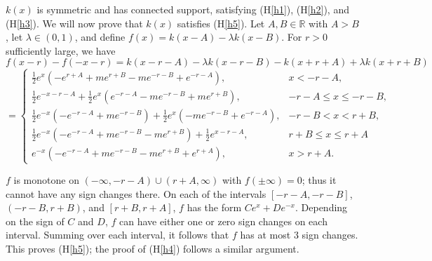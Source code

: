 \documentclass[11pt]{article}
\theoremstyle{definition}
\numberwithin{equation}{section}
\numberwithin{thm}{section}
\newcommand{\hypref}[1]{{(H{\ref{#1}})}}
\begin{document}
$k(x)$ is symmetric and has connected support, satisfying \hypref{h1}, \hypref{h2}, and \hypref{h3}.
We will now prove that $k(x)$ satisfies \hypref{h5}.
Let $A,B\in\mathbb R$ with $A>B$, let $\lambda \in (0,1)$, and define $f(x) = k(x-A) - \lambda k(x-B)$.
For $r>0$ sufficiently large, we have
$$
f(x-r) - f(-x-r) = k(x-r-A) - \lambda k(x-r-B) - k(x+r+A) + \lambda k(x+r+B)
$$
$$
= \begin{cases}
\frac{1}{2} e^{x}\left(-e^{r+A}+me^{r+B}-me^{-r-B}+e^{-r-A}\right) , & x < -r-A, \\
\frac{1}{2}e^{-x-r-A}+\frac{1}{2}e^{x}\left(e^{-r-A}-me^{-r-B}+me^{r+B}\right) , & -r-A \leq x \leq -r-B, \\
\frac{1}{2}e^{-x}\left(-e^{-r-A}+me^{-r-B}\right)+\frac{1}{2}e^{x}\left(-me^{-r-B}+e^{-r-A}\right) , & -r-B < x < r+B, \\
\frac{1}{2}e^{-x}\left(-e^{-r-A}+me^{-r-B}-me^{r+B}\right)+\frac{1}{2}e^{x-r-A}, & r+B \leq x \leq r+A \\
e^{-x}\left(-e^{-r-A}+me^{-r-B}-me^{r+B}+e^{r+A}\right), & x > r+A.
\end{cases}
$$

$f$ is monotone on $(-\infty,-r-A)\cup(r+A,\infty)$ with $f(\pm\infty)=0$; thus it cannot have any sign changes there.
On each of the intervals $[-r-A,-r-B]$, $(-r-B,r+B)$, and $[r+B,r+A]$, $f$ has the form $Ce^x+De^{-x}$.
Depending on the sign of $C$ and $D$, $f$ can have either one or zero sign changes on each interval.
Summing over each interval, it follows that $f$ has at most $3$ sign changes.
This proves \hypref{h5}; the proof of \hypref{h4} follows a similar argument.
\end{document}
